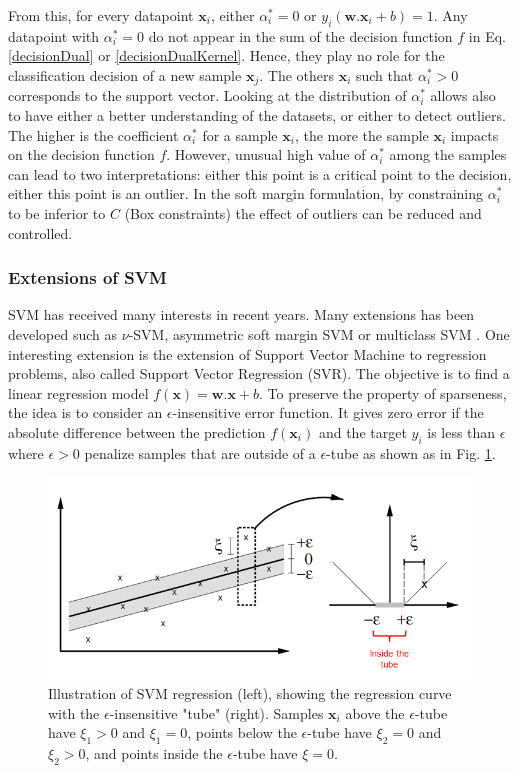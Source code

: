 From this, for every datapoint $\textbf{x}_i$, either $\alpha_i^* = 0$ or $y_i(\textbf{w}.\textbf{x}_i+b) = 1$. Any datapoint with $\alpha_i^* = 0$ do not appear in the sum of the decision function $f$ in Eq. \ref{decisionDual} or \ref{decisionDualKernel}. Hence, they play no role for the classification decision of a new sample $\textbf{x}_j$. The others $\textbf{x}_i$ such that $\alpha_i^* > 0$ corresponds to the support vector. Looking at the distribution of $\alpha_i^*$ allows also to have either a better understanding of the datasets, or either to detect outliers. The higher is the coefficient $\alpha_i^*$ for a sample $\textbf{x}_i$, the more the sample $\textbf{x}_i$ impacts on the decision function $f$. However, unusual high value of $\alpha_i^*$ among the samples can lead to two interpretations: either this point is a critical point to the decision, either this point is an outlier. In the soft margin formulation, by constraining $\alpha_i^*$ to be inferior to $C$ (Box constraints) the effect of outliers can be reduced and controlled. 




\subsubsection{Extensions of SVM}
SVM has received many interests in recent years. Many extensions has been developed such as $\nu$-SVM, asymmetric soft margin SVM or multiclass SVM \cite{Kijsirikul2002,Crammer2001}. One interesting extension is the extension of Support Vector Machine to regression problems, also called Support Vector Regression (SVR). The objective is to find a linear regression model $f(\textbf{x})=\textbf{w}.\textbf{x}+b$. To preserve the property of sparseness, the idea is to consider an $\epsilon$-insensitive error function. It gives zero error if the absolute difference between
the prediction $f(\textbf{x}_i)$ and the target $y_i$ is less than $\epsilon$ where $\epsilon > 0$ penalize samples that are outside of a $\epsilon$-tube as shown as in Fig. \ref{fig:SVR_tube}.

\begin{figure}[h!]
\centering
\includegraphics[width=0.8\linewidth]{images/SVR_tube}
\caption{Illustration of SVM regression (left), showing the regression curve with the $\epsilon$-insensitive "tube" (right). Samples $\textbf{x}_i$ above the $\epsilon$-tube have $\xi_1 > 0$ and $\xi_1 = 0$, points below the $\epsilon$-tube have $\xi_2 = 0$ and $\xi_2 > 0$, and points inside the $\epsilon$-tube have $\xi = 0$.}
\label{fig:SVR_tube}
\end{figure}

